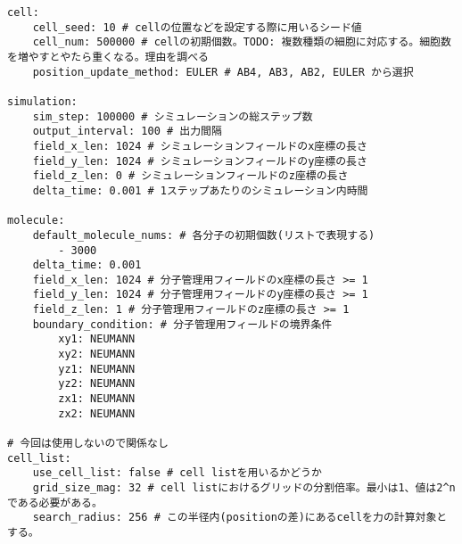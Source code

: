 \documentclass[vipdfmx,a4paper,11pt]{jsarticle}
\begin{document}
\begin{lstlisting}[caption=config.yaml]
cell:
    cell_seed: 10 # cellの位置などを設定する際に用いるシード値
    cell_num: 500000 # cellの初期個数。TODO: 複数種類の細胞に対応する。細胞数を増やすとやたら重くなる。理由を調べる
    position_update_method: EULER # AB4, AB3, AB2, EULER から選択

simulation:
    sim_step: 100000 # シミュレーションの総ステップ数
    output_interval: 100 # 出力間隔
    field_x_len: 1024 # シミュレーションフィールドのx座標の長さ
    field_y_len: 1024 # シミュレーションフィールドのy座標の長さ
    field_z_len: 0 # シミュレーションフィールドのz座標の長さ
    delta_time: 0.001 # 1ステップあたりのシミュレーション内時間

molecule:
    default_molecule_nums: # 各分子の初期個数(リストで表現する)
        - 3000
    delta_time: 0.001
    field_x_len: 1024 # 分子管理用フィールドのx座標の長さ >= 1
    field_y_len: 1024 # 分子管理用フィールドのy座標の長さ >= 1
    field_z_len: 1 # 分子管理用フィールドのz座標の長さ >= 1
    boundary_condition: # 分子管理用フィールドの境界条件
        xy1: NEUMANN
        xy2: NEUMANN
        yz1: NEUMANN
        yz2: NEUMANN
        zx1: NEUMANN
        zx2: NEUMANN

# 今回は使用しないので関係なし
cell_list:
    use_cell_list: false # cell listを用いるかどうか
    grid_size_mag: 32 # cell listにおけるグリッドの分割倍率。最小は1、値は2^nである必要がある。
    search_radius: 256 # この半径内(positionの差)にあるcellを力の計算対象とする。
\end{lstlisting}
\end{document}
